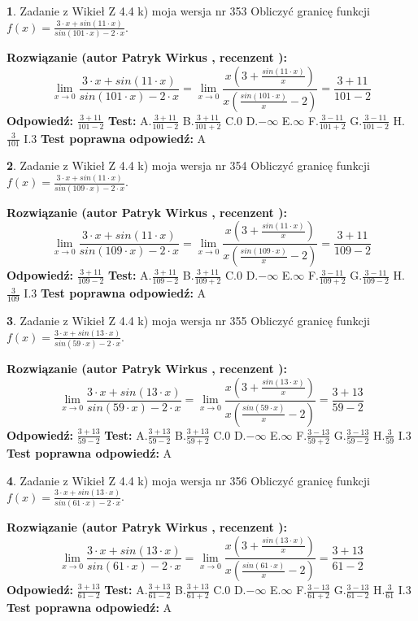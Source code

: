 \documentclass[12pt, a4paper]{article}
\theoremstyle{definition} %
\newtheorem{zad}{}
\newcommand{\zadStart}[1]{\begin{zad}#1\newline}
\newcommand{\zadStop}{\end{zad}}
\newcommand{\rozwStart}[2]{\noindent \textbf{Rozwiązanie (autor #1 , recenzent #2): }\newline}
\newcommand{\rozwStop}{\newline}
\newcommand{\odpStart}{\noindent \textbf{Odpowiedź:}\newline}
\newcommand{\odpStop}{\newline}
\newcommand{\testStart}{\noindent \textbf{Test:}\newline}
\newcommand{\testStop}{\newline}
\newcommand{\kluczStart}{\noindent \textbf{Test poprawna odpowiedź:}\newline}
\newcommand{\kluczStop}{\newline}
\begin{document}
\zadStart{Zadanie z Wikieł Z 4.4 k) moja wersja nr 353}
Obliczyć granicę funkcji $f(x)=\frac{3\cdot x +sin(11\cdot x)}{sin(101\cdot x) -2\cdot x}$.
\zadStop
\rozwStart{Patryk Wirkus}{}
$$\lim\limits_{x\to 0}\frac{3\cdot x +sin(11\cdot x)}{sin(101\cdot x) -2\cdot x}
=\lim\limits_{x\to 0}\frac{x(3+\frac{sin(11\cdot x)}{x})}{x(\frac{sin(101\cdot x)}{x}-2)}
=\frac{3+11}{101-2}$$
\rozwStop
\odpStart
$\frac{3+11}{101-2}$
\odpStop
\testStart
A.$\frac{3+11}{101-2}$
B.$\frac{3+11}{101+2}$
C.$0$
D.$-\infty$
E.$\infty$
F.$\frac{3-11}{101+2}$
G.$\frac{3-11}{101-2}$
H.$\frac{3}{101}$
I.$3$
\testStop
\kluczStart
A
\kluczStop



\zadStart{Zadanie z Wikieł Z 4.4 k) moja wersja nr 354}
Obliczyć granicę funkcji $f(x)=\frac{3\cdot x +sin(11\cdot x)}{sin(109\cdot x) -2\cdot x}$.
\zadStop
\rozwStart{Patryk Wirkus}{}
$$\lim\limits_{x\to 0}\frac{3\cdot x +sin(11\cdot x)}{sin(109\cdot x) -2\cdot x}
=\lim\limits_{x\to 0}\frac{x(3+\frac{sin(11\cdot x)}{x})}{x(\frac{sin(109\cdot x)}{x}-2)}
=\frac{3+11}{109-2}$$
\rozwStop
\odpStart
$\frac{3+11}{109-2}$
\odpStop
\testStart
A.$\frac{3+11}{109-2}$
B.$\frac{3+11}{109+2}$
C.$0$
D.$-\infty$
E.$\infty$
F.$\frac{3-11}{109+2}$
G.$\frac{3-11}{109-2}$
H.$\frac{3}{109}$
I.$3$
\testStop
\kluczStart
A
\kluczStop



\zadStart{Zadanie z Wikieł Z 4.4 k) moja wersja nr 355}
Obliczyć granicę funkcji $f(x)=\frac{3\cdot x +sin(13\cdot x)}{sin(59\cdot x) -2\cdot x}$.
\zadStop
\rozwStart{Patryk Wirkus}{}
$$\lim\limits_{x\to 0}\frac{3\cdot x +sin(13\cdot x)}{sin(59\cdot x) -2\cdot x}
=\lim\limits_{x\to 0}\frac{x(3+\frac{sin(13\cdot x)}{x})}{x(\frac{sin(59\cdot x)}{x}-2)}
=\frac{3+13}{59-2}$$
\rozwStop
\odpStart
$\frac{3+13}{59-2}$
\odpStop
\testStart
A.$\frac{3+13}{59-2}$
B.$\frac{3+13}{59+2}$
C.$0$
D.$-\infty$
E.$\infty$
F.$\frac{3-13}{59+2}$
G.$\frac{3-13}{59-2}$
H.$\frac{3}{59}$
I.$3$
\testStop
\kluczStart
A
\kluczStop



\zadStart{Zadanie z Wikieł Z 4.4 k) moja wersja nr 356}
Obliczyć granicę funkcji $f(x)=\frac{3\cdot x +sin(13\cdot x)}{sin(61\cdot x) -2\cdot x}$.
\zadStop
\rozwStart{Patryk Wirkus}{}
$$\lim\limits_{x\to 0}\frac{3\cdot x +sin(13\cdot x)}{sin(61\cdot x) -2\cdot x}
=\lim\limits_{x\to 0}\frac{x(3+\frac{sin(13\cdot x)}{x})}{x(\frac{sin(61\cdot x)}{x}-2)}
=\frac{3+13}{61-2}$$
\rozwStop
\odpStart
$\frac{3+13}{61-2}$
\odpStop
\testStart
A.$\frac{3+13}{61-2}$
B.$\frac{3+13}{61+2}$
C.$0$
D.$-\infty$
E.$\infty$
F.$\frac{3-13}{61+2}$
G.$\frac{3-13}{61-2}$
H.$\frac{3}{61}$
I.$3$
\testStop
\kluczStart
A
\kluczStop
\end{document}
